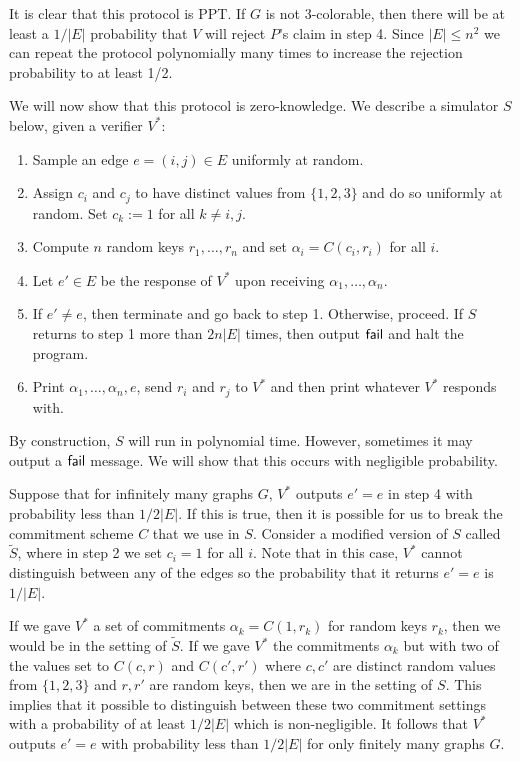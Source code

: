 It is clear that this protocol is PPT. If $G$ is not 3-colorable, then there will be at least a $1/|E|$ probability that $V$ will reject $P$'s claim in step 4. Since $|E| \leq n^2$ we can repeat the protocol polynomially many times to increase the rejection probability to at least 1/2.

We will now show that this protocol is zero-knowledge. We describe a simulator $S$ below, given a verifier $V^*$: \begin{enumerate}
\item Sample an edge $e = (i, j) \in E$ uniformly at random.

\item Assign $c_i$ and $c_j$ to have distinct values from $\{ 1, 2, 3 \}$ and do so uniformly at random. Set $c_k := 1$ for all $k \neq i, j$.

\item Compute $n$ random keys $r_1, \ldots, r_n$ and set $\alpha_i = C(c_i, r_i)$ for all $i$.

\item Let $e' \in E$ be the response of $V^*$ upon receiving $\alpha_1, \ldots, \alpha_n$.

\item If $e' \neq e$, then terminate and go back to step 1. Otherwise, proceed. If $S$ returns to step 1 more than $2n |E|$ times, then output $\sf{fail}$ and halt the program.

\item Print $\alpha_1, \ldots, \alpha_n, e$, send $r_i$ and $r_j$ to $V^*$ and then print whatever $V^*$ responds with.
\end{enumerate}

By construction, $S$ will run in polynomial time. However, sometimes it may output a $\sf{fail}$ message. We will show that this occurs with negligible probability.

Suppose that for infinitely many graphs $G$, $V^*$ outputs $e' = e$ in step 4 with probability less than $1/2|E|$. If this is true, then it is possible for us to break the commitment scheme $C$ that we use in $S$. Consider a modified version of $S$ called $\tilde{S}$, where in step 2 we set $c_i = 1$ for all $i$. Note that in this case, $V^*$ cannot distinguish between any of the edges so the probability that it returns $e' = e$ is $1/|E|$.

If we gave $V^*$ a set of commitments $\alpha_k = C(1, r_k)$ for random keys $r_k$, then we would be in the setting of $\tilde{S}$. If we gave $V^*$ the commitments $\alpha_k$ but with two of the values set to $C(c, r)$ and $C(c', r')$ where $c, c'$ are distinct random values from $\{ 1, 2, 3 \}$ and $r, r'$ are random keys, then we are in the setting of $S$. This implies that it possible to distinguish between these two commitment settings with a probability of at least $1/2|E|$ which is non-negligible. It follows that $V^*$ outputs $e' = e$ with probability less than $1/2|E|$ for only finitely many graphs $G$.

